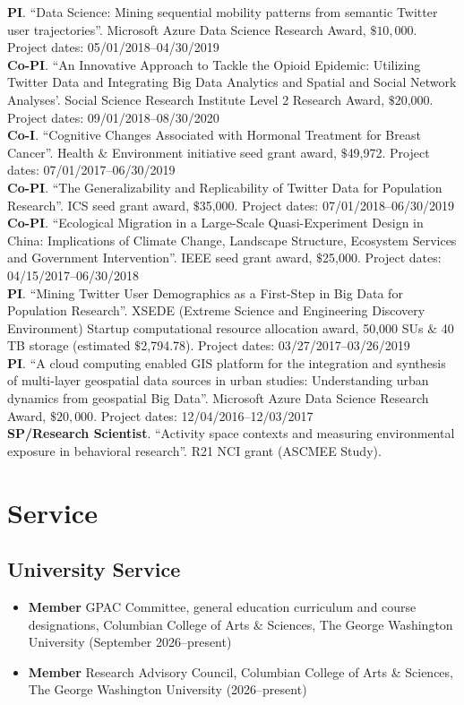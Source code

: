 \documentclass[11pt, a4paper]{article}
\begin{document}
\textbf{PI}. ``Data Science: Mining sequential mobility patterns from semantic Twitter user trajectories''. Microsoft Azure Data Science Research Award, $\$10,000$. Project dates: 05/01/2018--04/30/2019\\
\textbf{Co-PI}. ``An Innovative Approach to Tackle the Opioid Epidemic: Utilizing Twitter Data and Integrating Big Data Analytics and Spatial and Social Network Analyses'. Social Science Research Institute Level 2 Research Award, $\$$20,000. Project dates: 09/01/2018--08/30/2020\\
\textbf{Co-I}. ``Cognitive Changes Associated with Hormonal Treatment for Breast Cancer''. Health $\&$ Environment initiative seed grant award, $\$$49,972. Project dates: 07/01/2017--06/30/2019\\
\textbf{Co-PI}. ``The Generalizability and Replicability of Twitter Data for Population Research''. ICS seed grant award, $\$$35,000. Project dates: 07/01/2018--06/30/2019\\
\textbf{Co-PI}. ``Ecological Migration in a Large-Scale Quasi-Experiment Design in China: Implications of Climate Change, Landscape Structure, Ecosystem Services and Government Intervention''. IEEE seed grant award, $\$$25,000. Project dates: 04/15/2017--06/30/2018\\
\textbf{PI}. ``Mining Twitter User Demographics as a First-Step in Big Data for Population Research''. XSEDE (Extreme Science and Engineering Discovery Environment) Startup computational resource allocation award, 50,000 SUs $\&$ 40 TB storage (estimated $\$$2,794.78). Project dates: 03/27/2017--03/26/2019\\
\textbf{PI}. ``A cloud computing enabled GIS platform for the integration and synthesis of multi-layer geospatial data sources in urban studies: Understanding urban dynamics from geospatial Big Data''. Microsoft Azure Data Science Research Award, $\$20,000$. Project dates: 12/04/2016--12/03/2017\\
\textbf{SP/Research Scientist}. ``Activity space contexts and measuring environmental exposure in behavioral research''. R21 NCI grant (ASCMEE Study).

\section*{Service}
\subsection*{University Service}
\begin{itemize}
\item{\textbf{Member} GPAC Committee, general education curriculum and course designations, Columbian College of Arts \& Sciences, The George Washington University (September 2026--present)}
\item{\textbf{Member} Research Advisory Council, Columbian College of Arts \& Sciences, The George Washington University (2026--present)}
\end{itemize}
\end{document}

